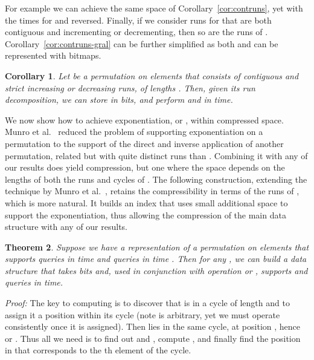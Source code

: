 \documentclass[11pt]{article}
\newtheorem{theorem}{Theorem}
\newtheorem{corollary}[theorem]{Corollary}
\newenvironment{proof}{\textit{Proof:}}{\hfill \paragraph{} }
\begin{document}
\begin{table}[t]
{\begin{tabular}
\smallskip

For example we can achieve the same space of Corollary~\ref{cor:contruns}, yet
with the times for  and  reversed.
Finally, if we consider runs for  that are both contiguous and 
incrementing or decrementing, then  so are the runs of .
Corollary~\ref{cor:contruns-gral} can be further simplified as both  and 
can be represented with bitmaps.

\begin{corollary} \label{cor:contstrictruns}
  Let  be a permutation on  elements that consists of 
  contiguous and strict increasing or decreasing runs, of lengths .
Then, given its run decomposition, we can store  in 
   bits, and perform  
  and  in  time.
\end{corollary}

\smallskip

We now show how to achieve exponentiation,  or ,
within compressed space.
Munro et al.~\cite{MRRR03} reduced the problem of supporting
exponentiation on a permutation  to the support of the direct and
inverse application of another permutation, related but with quite
distinct runs than . Combining it with any of our results does yield 
compression, but one where the space depends on the lengths of both the 
runs and cycles of .
The following construction, extending the technique by Munro et 
al.~\cite{MRRR03}, retains the compressibility in terms of the runs 
of , which is more natural. 
It builds an index that uses small additional space to
support the exponentiation, thus allowing the compression of the main
data structure with any of our results.

\begin{theorem} \label{thm:exponent} Suppose we have a representation
  of a permutation  on  elements that supports queries  
  in time  and queries  in time . 
  Then for any , we can build a data structure that takes 
   bits and, used in conjunction with operation 
  or , supports  and  queries in 
   time.
\end{theorem}

\begin{proof}
The key to computing  is to discover that  is in a cycle of length
 and to assign it a position  within its cycle (note
 is arbitrary, yet we must operate consistently once it is assigned).
Then  lies in the same cycle, at position 
, hence  or
. Thus all we need is to 
find out  and , compute , and finally find the position  in
 that corresponds to the th element of the cycle.


\end{proof}
\end{tabular}}
\end{table}
\end{document}
